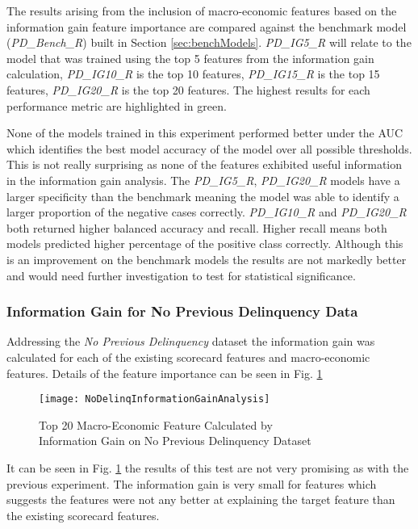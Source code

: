 The results arising from the inclusion of macro-economic features based on the information gain feature importance are compared against the benchmark model (\textit{PD\_Bench\_R}) built in Section \ref{sec:benchModels}. \textit{PD\_IG5\_R} will relate to the model that was trained using the top 5 features from the information gain calculation, \textit{PD\_IG10\_R} is the top 10 features, \textit{PD\_IG15\_R} is the top 15 features, \textit{PD\_IG20\_R} is the top 20 features. The highest results for each performance metric are highlighted in green.

None of the models trained in this experiment performed better under the AUC which identifies the best model accuracy of the model over all possible thresholds. This is not really surprising as none of the features exhibited useful information in the information gain analysis. The \textit{PD\_IG5\_R}, \textit{PD\_IG20\_R} models have a larger specificity than the benchmark meaning the model was able to identify a larger proportion of the negative cases correctly. \textit{PD\_IG10\_R} and \textit{PD\_IG20\_R} both returned higher balanced accuracy and recall. Higher recall means both models predicted higher percentage of the positive class correctly. Although this is an improvement on the benchmark models the results are not markedly better and would need further investigation to test for statistical significance.

\subsubsection{Information Gain for No Previous Delinquency Data}\label{IGNPDExper}
Addressing the \textit{No Previous Delinquency} dataset the information gain was calculated for each of the existing scorecard features and macro-economic features. Details of the feature importance can be seen in Fig. \ref{fig:NoDelinqInformationGainAnalysis}

\begin{figure}[H]
	\texttt{[image: NoDelinqInformationGainAnalysis]}
	\caption{Top 20 Macro-Economic Feature Calculated by \\ Information Gain on No Previous Delinquency Dataset}
	\label{fig:NoDelinqInformationGainAnalysis}
\end{figure}

It can be seen in Fig. \ref{fig:NoDelinqInformationGainAnalysis} the results of this test are not very promising as with the previous experiment. The information gain is very small for features which suggests the features were not any better at explaining the target feature than the existing scorecard features. 

